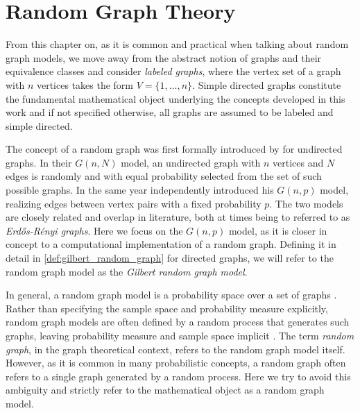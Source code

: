 




\newpage
\section{Random Graph Theory}\label{sec:random_graph_theory}


From this chapter on, as it is common and practical when talking about
random graph models, we move away from the abstract notion
of graphs and their equivalence classes and consider \textit{labeled
  graphs}, where the vertex set of a graph with $n$ vertices takes the
form $V = \{1,\ldots,n\}$. Simple directed graphs constitute the
fundamental mathematical object underlying the concepts developed in
this work and if not specified otherwise, all graphs are assumed to be
labeled and simple directed.

The concept of a random graph was first formally introduced by
\textcite{Erdos1959} for undirected graphs. In their $G(n,N)$ model,
an undirected graph with $n$ vertices and $N$ edges is randomly and
with equal probability selected from the set of such possible
graphs. In the same year \textcite{Gilbert1959} independently
introduced his $G(n,p)$ model, realizing edges between vertex pairs
with a fixed probability $p$. The two models are closely
related \parencite{Luczak1990} and overlap in literature, both at
times being to referred to as \textit{Erd\H{o}s-R\'{e}nyi
  graphs}. Here we focus on the $G(n,p)$ model, as it is closer in
concept to a computational implementation of a random graph. Defining
it in detail in \ref{def:gilbert_random_graph} for directed graphs, we
will refer to the random graph model as the \textit{Gilbert random
  graph model}.

%
In general, a random graph model is a probability space over a set of
graphs \parencite{Janson_Random-graphs}. Rather than specifying the
sample space and probability
measure explicitly, random graph models are often defined by a random
process that generates such graphs, leaving probability measure and
sample space implicit \parencite{Bollobas_Random-graphs}. The term
\textit{random graph}, in the graph theoretical context, refers to the
random graph model itself. However, as it is common in many
probabilistic concepts, a random graph often refers to a single graph
generated by a random process. Here we try to avoid this ambiguity and
strictly refer to the mathematical object as a random graph model.

